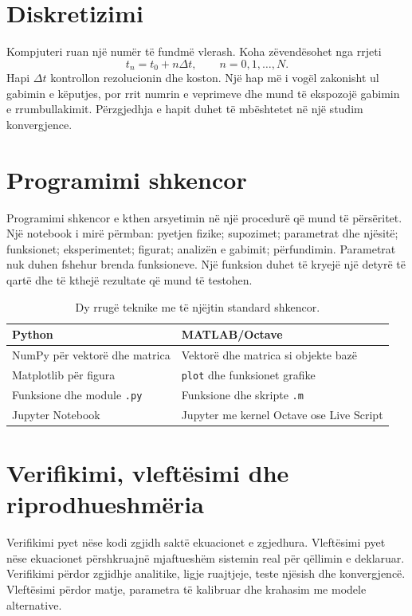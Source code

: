 \documentclass[11pt,oneside,openany]{book}
\begin{document}
\section{Diskretizimi}
Kompjuteri ruan një numër të fundmë vlerash. Koha zëvendësohet nga rrjeti
\begin{equation}
 t_n=t_0+n\Delta t,\qquad n=0,1,\ldots,N.
\end{equation}
Hapi $\Delta t$ kontrollon rezolucionin dhe koston. Një hap më i vogël zakonisht ul gabimin e këputjes, por rrit numrin e veprimeve dhe mund të ekspozojë gabimin e rrumbullakimit. Përzgjedhja e hapit duhet të mbështetet në një studim konvergjence.

\section{Programimi shkencor}
Programimi shkencor e kthen arsyetimin në një procedurë që mund të përsëritet. Një notebook i mirë përmban: pyetjen fizike; supozimet; parametrat dhe njësitë; funksionet; eksperimentet; figurat; analizën e gabimit; përfundimin. Parametrat nuk duhen fshehur brenda funksioneve. Një funksion duhet të kryejë një detyrë të qartë dhe të kthejë rezultate që mund të testohen.

\begin{table}[ht]
\centering
\caption{Dy rrugë teknike me të njëjtin standard shkencor.}
\begin{tabularx}{\textwidth}{YY}
\toprule Python & MATLAB/Octave\\ \midrule
NumPy për vektorë dhe matrica & Vektorë dhe matrica si objekte bazë\\
Matplotlib për figura & \texttt{plot} dhe funksionet grafike\\
Funksione dhe module \texttt{.py} & Funksione dhe skripte \texttt{.m}\\
Jupyter Notebook & Jupyter me kernel Octave ose Live Script\\
\bottomrule
\end{tabularx}
\end{table}

\section{Verifikimi, vleftësimi dhe riprodhueshmëria}
Verifikimi pyet nëse kodi zgjidh saktë ekuacionet e zgjedhura. Vleftësimi pyet nëse ekuacionet përshkruajnë mjaftueshëm sistemin real për qëllimin e deklaruar. Verifikimi përdor zgjidhje analitike, ligje ruajtjeje, teste njësish dhe konvergjencë. Vleftësimi përdor matje, parametra të kalibruar dhe krahasim me modele alternative.
\end{document}
